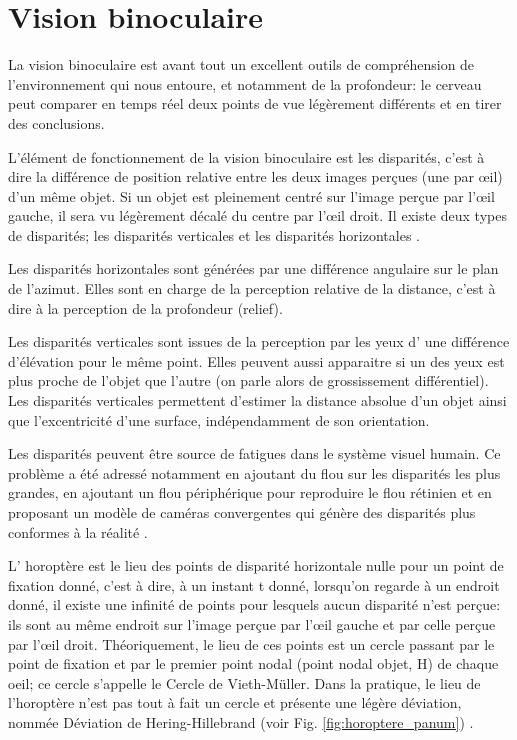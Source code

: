 	\section{Vision binoculaire}
	\par La vision binoculaire est avant tout un excellent outils de compréhension de l'environnement qui nous entoure, et notamment de la profondeur: le cerveau peut comparer en temps réel deux points de vue légèrement différents et en tirer des conclusions.
	
	\par L'élément de fonctionnement de la vision binoculaire est les disparités, c'est à dire la différence de position relative entre les deux images perçues (une par œil) d'un même objet. Si un objet est pleinement centré sur l'image perçue par l'œil gauche, il sera vu légèrement décalé du centre par l'œil droit.	Il existe deux types de disparités; les disparités verticales et les disparités horizontales \citep{devisme_optimisation_2004}.
	
	\par Les disparités horizontales sont générées par une différence angulaire sur le plan de l'azimut. Elles sont en charge de la perception relative de la distance, c'est à dire à la perception de la profondeur (relief).
	
	\par Les disparités verticales sont issues de la perception par les yeux d' une différence d'élévation pour le même point. Elles peuvent aussi apparaitre si un des yeux est plus proche de l'objet que l'autre (on parle alors de grossissement différentiel). Les disparités verticales permettent d'estimer la distance absolue d'un objet ainsi que l'excentricité d'une surface, indépendamment de son orientation.
	
	\par Les disparités peuvent être source de fatigues dans le système visuel humain. Ce problème a été adressé notamment en ajoutant du flou sur les disparités les plus grandes, en ajoutant un flou périphérique pour reproduire le flou rétinien et en proposant un modèle de caméras convergentes qui génère des disparités plus conformes à la réalité \citep{aurat_immersion_2016}.
	
	\par L' horoptère est le lieu des points de disparité horizontale nulle pour un point de fixation donné, c'est à dire, à un instant t donné, lorsqu'on regarde à un endroit donné, il existe une infinité de points pour lesquels aucun disparité n'est perçue: ils sont au même endroit sur l'image perçue par l'œil gauche et par celle perçue par l'œil droit. Théoriquement, le lieu de ces points est un cercle passant par le point de fixation et par le premier point nodal (point nodal objet, H) de chaque oeil; ce cercle s'appelle le Cercle de Vieth-Müller. Dans la pratique, le lieu de l'horoptère n'est pas tout à fait un cercle et présente une légère déviation, nommée Déviation de Hering-Hillebrand (voir Fig. \ref{fig:horoptere_panum}) \citep{neveu_impact_2012}.
	
